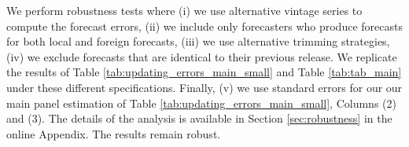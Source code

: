We perform robustness tests where (i) we use alternative vintage series to compute the forecast errors, (ii) we include only forecasters who produce forecasts for both local and foreign forecasts, (iii) we use alternative trimming strategies, (iv) we exclude forecasts that are identical to their previous release. We replicate the results of Table \ref{tab:updating_errors_main_small} and Table \ref{tab:tab_main} under these different specifications.  Finally, (v) we use \citet{Driscoll1998} standard errors for our our main panel estimation of Table \ref{tab:updating_errors_main_small}, Columns (2) and (3). The details of the analysis is available in Section \ref{sec:robustness} in the online Appendix. The results remain robust.

